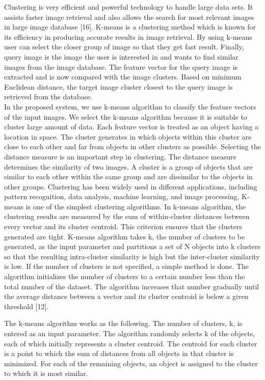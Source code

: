  \vspace*{1pc}
Clustering is very efficient and powerful technology to handle large data sets. It assists faster image retrieval and also allows the search for most relevant images in large image database [16]. K-means is a clustering method which is known for its efficiency in producing accurate results in image retrieval. By using k-means user can select the closer group of image so that they get fast result. 
Finally, query image is the image the user is interested in and wants to find similar images from the image database. The feature vector for the query image is extracted and is now compared with the image clusters. Based on minimum Euclidean distance, the target image cluster closest to the query image is retrieved from the database.\\
In the proposed system, we use k-means algorithm to classify the feature vectors of the input images. We select the k-means algorithm because it is suitable to cluster large amount of data. Each feature vector is treated as an object having a location in space. The cluster generates in which objects within this cluster are close to each other and far from objects in other clusters as possible. Selecting the distance measure is an important step in clustering. The distance measure determines the similarity of two images. 
A cluster is a group of objects that are similar to each other within the same group and are dissimilar to the objects in other groups. Clustering has been widely used in different applications, including pattern recognition, data analysis, machine learning, and image processing. K-means is one of the simplest clustering algorithms. In k-means algorithm, the clustering results are measured by the sum of within-cluster distances between every vector and its cluster centroid. This criterion ensures that the clusters generated are tight. K-means algorithm takes k, the number of clusters to be generated, as the input parameter and partitions a set of N objects into k clusters so that the resulting intra-cluster similarity is high but the inter-cluster similarity is low. If the number of clusters is not specified, a simple method is done. The algorithm initializes the number of clusters to a certain number less than the total number of the dataset. The algorithm increases that number gradually until the average distance between a vector and its cluster centroid is below a given threshold [12].

  \vspace*{1pc}
The k-means algorithm works as the following. The number of clusters, k, is entered as an input parameter. The algorithm randomly selects k of the objects, each of which initially represents a cluster centroid. The centroid for each cluster is a point to which the sum of distances from all objects in that cluster is minimized. For each of the remaining objects, an object is assigned to the cluster to which it is most similar.
